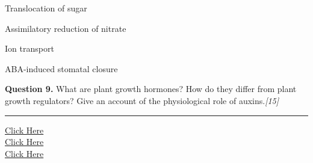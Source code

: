 \documentclass[11pt,a4paper]{article}
\newcommand{\pts}[1]{\hfill   \textit{[#1]}}
\begin{document}
\begin{parts}
  \item Translocation of sugar
  \item Assimilatory reduction of nitrate
  \item Ion transport
  \item ABA-induced stomatal closure
\end{parts}

\medskip


\noindent   \textbf{Question 9.} What are plant growth hormones? How do they differ from plant growth regulators? Give an account of the physiological role of auxins.\pts{15}

\vfill
\rule{\linewidth}{0.4pt}

\begin{center}\small
\href{https://bhu-exam.vercel.app/}{Click Here}\\[4pt]\href{https://me-aryan.vercel.app/}{Click Here}\\[4pt]\href{https://quashan-me.vercel.app/}{Click Here}
\end{center}
\end{document}
